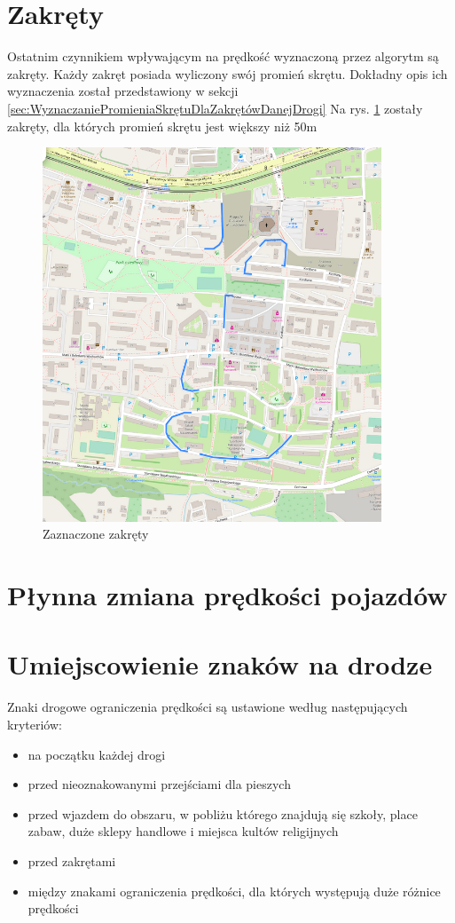 \section{Zakręty}
Ostatnim czynnikiem wpływającym na prędkość wyznaczoną przez algorytm są zakręty. Każdy zakręt posiada wyliczony swój promień skrętu. Dokładny opis ich wyznaczenia został przedstawiony w sekcji \ref{sec:WyznaczaniePromieniaSkrętuDlaZakrętówDanejDrogi}
Na rys. \ref{sec:zakrety} zostały zakręty, dla których promień skrętu jest większy niż 50m
\begin{figure}[h]
\caption{Zaznaczone zakręty}
\label{sec:zakrety}
\centering
\includegraphics[width=0.9\textwidth]{zakrety}
\end{figure}

\newpage
\section{Płynna zmiana prędkości pojazdów}


\newpage
\section{Umiejscowienie znaków na drodze}
\label{sec:speedLimitLocalization}
Znaki drogowe ograniczenia prędkości są ustawione według następujących kryteriów:
\begin{itemize}
\item na początku każdej drogi
\item przed nieoznakowanymi przejściami dla pieszych
\item przed wjazdem do obszaru, w pobliżu którego znajdują się szkoły, place zabaw, duże sklepy handlowe i miejsca kultów religijnych
\item przed zakrętami
\item między znakami ograniczenia prędkości, dla których występują duże różnice prędkości
\end{itemize}


